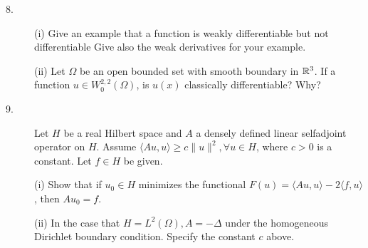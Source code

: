 \documentclass{article}
\begin{document}
\begin{description}
\item[8.] (i)
Give an example that a function is weakly differentiable but not
differentiable Give also the weak derivatives for your example.

\item[\quad] (ii)
Let $\Omega$ be an open bounded set with smooth boundary in $\Bbb R^3$. If
a function $u \in W^{2,2}_0 (\Omega)$, is $u(x)$ classically differentiable?
Why?

\item[9.]
Let $H$ be a real Hilbert space and $A$ a densely defined linear selfadjoint
operator on $H$. Assume
$\langle Au, u \rangle \geq c \parallel u \parallel^2, \forall u \in H$,
where $c>0$ is a constant. Let $f \in H$ be given.

\item[\quad] (i)
Show that if $u_0 \in H$ minimizes the functional
$F(u) = \langle Au, u \rangle - 2\langle f,u \rangle$, then
$Au_0 = f$.

\item[\quad] (ii)
In the case that $H = L^2(\Omega), A= -\Delta$ under the homogeneous
Dirichlet boundary condition. Specify the constant $c$ above.





\end{description}    
\end{document}
